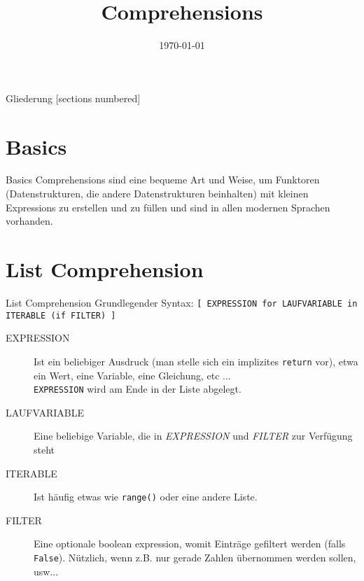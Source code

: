 



\title{Comprehensions}
\date{\today}




\maketitle

\begin{frame}{Gliederung}
	[sections numbered]
	\tableofcontents
\end{frame}


\section{Basics}
\begin{frame}{Basics}
  Comprehensions sind eine bequeme Art und Weise, um Funktoren (Datenstrukturen, die andere Datenstrukturen beinhalten) mit kleinen Expressions zu erstellen und zu füllen und sind in allen modernen Sprachen vorhanden.
\end{frame}



\section{List Comprehension}
\begin{frame}{List Comprehension}
  Grundlegender Syntax: \alert{\texttt{[ EXPRESSION for LAUFVARIABLE in ITERABLE (if FILTER) ]}}\\
  \begin{description}
    \item[EXPRESSION] Ist ein beliebiger Ausdruck (man stelle sich ein implizites \texttt{return} vor), etwa ein Wert, eine Variable, eine Gleichung, etc ... \\
    	\texttt{EXPRESSION} wird am Ende in der Liste abgelegt.
    \item[LAUFVARIABLE] Eine beliebige Variable, die in \textit{EXPRESSION} und \textit{FILTER} zur Verfügung steht
    \item[ITERABLE] Ist häufig etwas wie \texttt{range()} oder eine andere Liste.
    \item[FILTER] Eine optionale boolean expression, womit Einträge gefiltert werden (falls \texttt{False}). N\"utzlich, wenn z.B. nur gerade Zahlen \"ubernommen werden sollen, usw...
  \end{description}

\end{frame}

